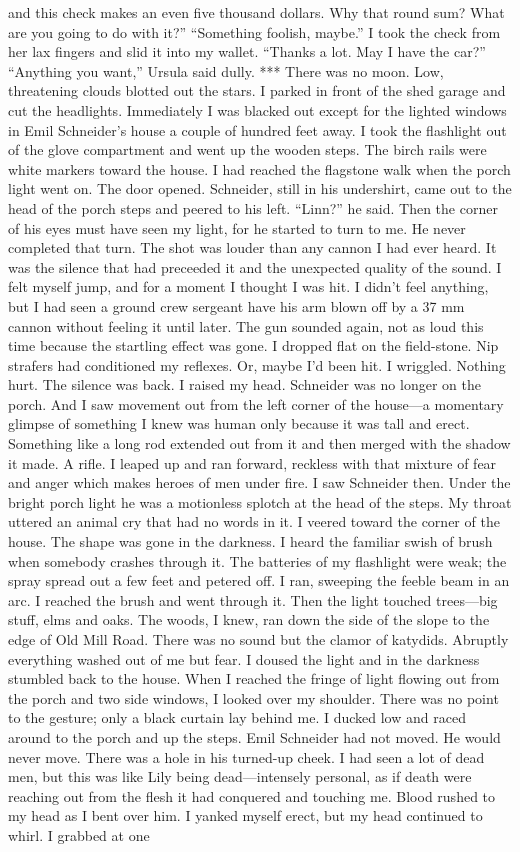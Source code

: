 \documentclass{novel}
\begin{document}
and this check makes an even five thousand dollars. Why that round sum? What are you going to do with it?” “Something foolish, maybe.” I took the check from her lax fingers and slid it into my wallet. “Thanks a lot. May I have the car?” “Anything you want,” Ursula said dully. *** There was no moon. Low, threatening clouds blotted out the stars. I parked in front of the shed garage and cut the headlights. Immediately I was blacked out except for the lighted windows in Emil Schneider’s house a couple of hundred feet away. I took the flashlight out of the glove compartment and went up the wooden steps. The birch rails were white markers toward the house. I had reached the flagstone walk when the porch light went on. The door opened. Schneider, still in his undershirt, came out to the head of the porch steps and peered to his left. “Linn?” he said. Then the corner of his eyes must have seen my light, for he started to turn to me. He never completed that turn. The shot was louder than any cannon I had ever heard. It was the silence that had preceeded it and the unexpected quality of the sound. I felt myself jump, and for a moment I thought I was hit. I didn’t feel anything, but I had seen a ground crew sergeant have his arm blown off by a 37 mm cannon without feeling it until later. The gun sounded again, not as loud this time because the startling effect was gone. I dropped flat on the field-stone. Nip strafers had conditioned my reflexes. Or, maybe I’d been hit. I wriggled. Nothing hurt. The silence was back. I raised my head. Schneider was no longer on the porch. And I saw movement out from the left corner of the house—a momentary glimpse of something I knew was human only because it was tall and erect. Something like a long rod extended out from it and then merged with the shadow it made. A rifle. I leaped up and ran forward, reckless with that mixture of fear and anger which makes heroes of men under fire. I saw Schneider then. Under the bright porch light he was a motionless splotch at the head of the steps. My throat uttered an animal cry that had no words in it. I veered toward the corner of the house. The shape was gone in the darkness. I heard the familiar swish of brush when somebody crashes through it. The batteries of my flashlight were weak; the spray spread out a few feet and petered off. I ran, sweeping the feeble beam in an arc. I reached the brush and went through it. Then the light touched trees—big stuff, elms and oaks. The woods, I knew, ran down the side of the slope to the edge of Old Mill Road. There was no sound but the clamor of katydids. Abruptly everything washed out of me but fear. I doused the light and in the darkness stumbled back to the house. When I reached the fringe of light flowing out from the porch and two side windows, I looked over my shoulder. There was no point to the gesture; only a black curtain lay behind me. I ducked low and raced around to the porch and up the steps. Emil Schneider had not moved. He would never move. There was a hole in his turned-up cheek. I had seen a lot of dead men, but this was like Lily being dead—intensely personal, as if death were reaching out from the flesh it had conquered and touching me. Blood rushed to my head as I bent over him. I yanked myself erect, but my head continued to whirl. I grabbed at one 
\end{document}
